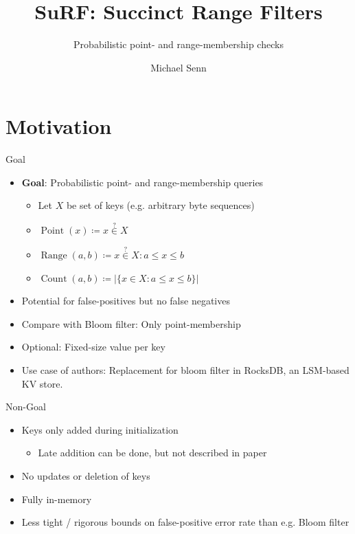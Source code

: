 \documentclass{beamer}
\title{SuRF: Succinct Range Filters}
\subtitle{Probabilistic point- and range-membership checks}
\author{Michael Senn}
\institute{Faculty of Science, University of Bern}
\date{\DTMusedate{presentation}}
\begin{document}
\maketitle


\section{Motivation}

\begin{frame}{Goal}
		\begin{itemize}
				\item \textbf{Goal}: Probabilistic point- and range-membership queries
						\begin{itemize}
								\item Let $X$ be set of keys (e.g. arbitrary byte sequences)
								\item $\operatorname{Point}(x) \coloneqq x \overset{?}{\in} X$
								\item $\operatorname{Range}(a, b) \coloneqq x \overset{?}{\in} X : a \leq x \leq b$
								\item $\operatorname{Count}(a, b) \coloneqq |\{x \in X : a \leq x \leq b\}|$
						\end{itemize}
				\item Potential for false-positives but no false negatives
				\item Compare with Bloom filter: Only point-membership
				\item Optional: Fixed-size value per key
				\item Use case of authors: Replacement for bloom filter in
						RocksDB, an LSM-based KV store.
		\end{itemize}
\end{frame}

\begin{frame}{Non-Goal}
		\begin{itemize}
				\item Keys only added during initialization
						\begin{itemize}
								\item Late addition can be done, but not
										described in paper
						\end{itemize}
				\item No updates or deletion of keys
				\item Fully in-memory
				\item Less tight / rigorous bounds on false-positive error rate
						than e.g. Bloom filter
		\end{itemize}
\end{frame}
\end{document}
